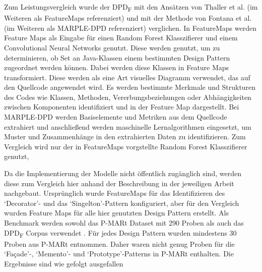 \documentclass[conference]{IEEEtran}
\begin{document}
Zum Leistungsvergleich wurde der DPD\textsubscript{F} mit den Ansätzen von Thaller et al. \cite{8667978} (im Weiteren als FeatureMaps referenziert) und mit der Methode von Fontana et al. \cite{ARCELLIFONTANA20112334} (im Weiteren als MARPLE-DPD referenziert) verglichen.
In FeatureMaps werden Feature Maps als Eingabe für einen Random Forest Klasszifierer und einem Convolutional Neural Networks genutzt. Diese werden genutzt, um zu determinieren, ob Set an Java-Klassen einem bestimmten Design Pattern zugeordnet werden können.
Dabei werden diese Klassen in Feature Maps transformiert. Diese werden als eine Art visuelles Diagramm verwendet, das auf den Quellcode angewendet wird. Es werden bestimmte Merkmale und Strukturen des Codes wie Klassen, Methoden, Vererbungsbeziehungen oder Abhängigkeiten zwischen Komponenten identifiziert und in der Feature Map dargestellt.
Bei MARPLE-DPD werden Basiselemente und Metriken aus dem Quellcode extrahiert und anschließend werden maschinelle Lernalgorithmen eingesetzt, um Muster und Zusammenhänge in den extrahierten Daten zu identifizieren. Zum Vergleich wird nur der in FeatureMaps vorgstellte Random Forest Klasszifierer genutzt,

Da die Implementierung der Modelle nicht öffentlich zugänglich sind, werden diese zum Vergleich hier anhand der Beschreibung in der jeweiligen Arbeit nachgebaut. \cite[p. 10]{NAZAR2022111179}
Ursprünglich wurde FeatureMaps für das Identifizieren des `Decorator'- und das `Singelton'-Pattern konfiguriert, aber für den Vergleich wurden Feature Maps für alle hier genutzten Design Pattern erstellt.
Als Benchmark werden sowohl das P-MARt Dataset mit 290 Proben als auch das DPD\textsubscript{F} Corpus verwendet  \cite[p. 10]{NAZAR2022111179}. Für jedes Design Pattern wurden mindestens 30 Proben aus P-MARt entnommen.
Daher waren nicht genug Proben für die `Façade'-, `Memento'- und `Prototype'-Patterns in P-MARt enthalten.
Die Ergebnisse sind wie gefolgt ausgefallen  \cite[p. 11]{NAZAR2022111179}
\end{document}
